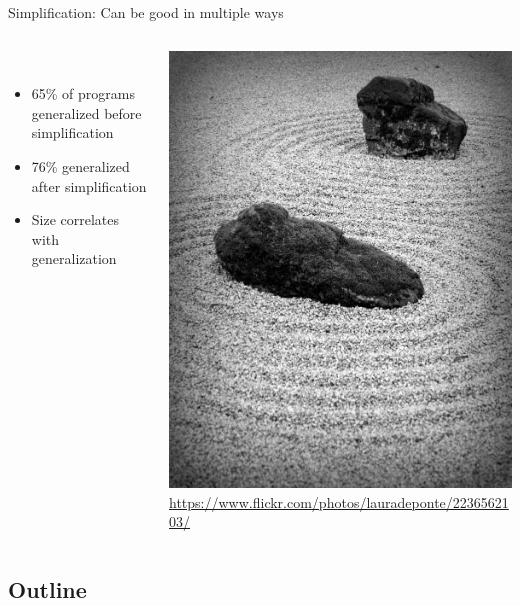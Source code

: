 \documentclass{beamer}
\begin{document}
\begin{frame}{Simplification: Can be good in multiple ways}
\begin{columns}
\begin{column}{0.6\textwidth}
\begin{overprint}
~

\begin{itemize}
	\item 65\% of programs generalized before simplification 
	\item 76\% generalized after simplification
	\item Size correlates with generalization
\end{itemize}

\end{overprint}

\end{column}
\begin{column}{0.4\textwidth}
\center \includegraphics[height=0.7\textheight]{Illustrations/zen.jpg} \\
\tiny \url{https://www.flickr.com/photos/lauradeponte/2236562103/}
\end{column}
\end{columns}
\end{frame}

\subsection*{Outline}
\end{document}
